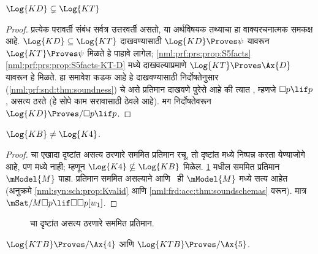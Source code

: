 \begin{prop}
  $\Log{KD} \subsetneq \Log{KT}$
\end{prop}

\begin{proof} प्रत्येक परावर्ती संबंध सर्वत्र उत्तरवर्ती असतो,
  या अर्थविषयक तथ्याचा हा वाक्यरचनात्मक समकक्ष आहे.
  $\Log{KD} \subseteq \Log{KT}$ दाखवण्यासाठी
  $\Log{KD} \Proves \psi$ यावरून
  $\Log{KT} \Proves \psi$ मिळते हे पाहावे लागेल;
  \ref{nml:prf:prs:prop:S5facts}\ref{nml:prf:prs:prop:S5facts-KT-D}
  मध्ये दाखवल्याप्रमाणे $\Log{KT} \Proves
  \Ax{D}$ यावरून हे मिळते. हा समावेश कडक आहे हे
  दाखवण्यासाठी निर्दोषतेनुसार
  (\ref{nml:prf:snd:thm:soundness})  चे असे
  प्रतिमान दाखवणे पुरेसे आहे की त्यात
  , म्हणजे $\Box p \lif p$, असत्य ठरते
  (हे सोपे काम सरावासाठी ठेवले आहे). मग निर्दोषतेवरून
  $\Log{KD} \Proves/ \Box p \lif p$.
\end{proof}

\begin{prop}
  $\Log{KB} \neq \Log{K4}$.
\end{prop}

\begin{proof}
   चा एखादा दृष्टांत असत्य ठरणारे सममित
  प्रतिमान रचू. तो दृष्टांत  मध्ये
  निष्पन्न करता येण्याजोगे आहे, पण  मध्ये नाही;
  म्हणून $\Log{K4} \nsubseteq \Log{KB}$ मिळेल.
  \ref{nml:prf:dis:fig:Bnot4} मधील सममित प्रतिमान
  $\mModel{M}$ पाहा. प्रतिमान सममित असल्याने
   आणि~ ही $\mModel{M}$ मध्ये सत्य
  आहेत (अनुक्रमे \ref{nml:syn:sch:prop:Kvalid}
  आणि \ref{nml:frd:acc:thm:soundschemas} वरून).
  मात्र $\mSat/{M}{\Box p \lif \Box\Box p}[w_1]$.
\end{proof}

\begin{figure}[htpb]
  \centering
  \caption{ चा दृष्टांत असत्य ठरणारे सममित प्रतिमान.}
  \label{nml:prf:dis:fig:Bnot4}
\end{figure}

\begin{thm}\label{nml:prf:dis:thm:KTBnot45}
  $\Log{KTB} \Proves/ \Ax{4}$ आणि $\Log{KTB} \Proves/ \Ax{5}$.
\end{thm}

